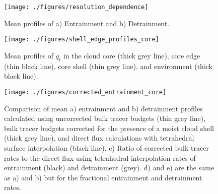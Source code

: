\documentclass[draft,grl]{AGUTeX}
\begin{document}



\begin{figure}
  \label{fig:resolution_dependence}
  \noindent\texttt{[image: ./figures/resolution\_dependence]}
  \caption{Mean profiles of a) Entrainment and b) Detrainment.}
\end{figure}

\begin{figure}
  \label{fig:shell_edge_profiles}
  \noindent\texttt{[image: ./figures/shell\_edge\_profiles\_core]}
  \caption{Mean profiles of $q_t$ in the cloud core (thick grey line), core 
edge (thin black line), core shell (thin grey line), and environment (thick 
black line).}
\end{figure}

\begin{figure}
  \label{fig:corrected_entrainment}
  \noindent\texttt{[image: ./figures/corrected\_entrainment\_core]}
  \caption{Comparison of mean a) entrainment and b) detrainment profiles 
calculated using uncorrected bulk tracer budgets (thin grey line), bulk tracer 
budgets corrected for the presence of a moist cloud shell (thick grey line), and
direct flux calculations with tetrahedral surface interpolation (black line).
c) Ratio of corrected bulk tracer rates to the direct flux using
tetrahedral interpolation rates of entrainment (black) and detrainment (grey).
d) and e) are the same as a) and b) but for the fractional entrainment and
detrainment rates.}
\end{figure}

%
%
%
%
%
%

\end{document}
